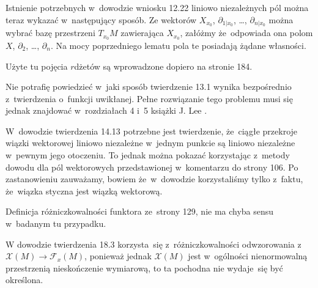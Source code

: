 \documentclass[a4paper,11pt]{article}
\begin{document}
\vspace{\spaceFour}


\start {} Istnienie potrzebnych w~dowodzie wniosku 12.22
liniowo niezależnych pól można teraz wykazać w~następujący sposób. Ze
wektorów $X_{ x_{ 0 } }$, $\partial_{ 1 | { x_{ 0 } } }$, \ldots,
$\partial_{ n | { x_{ 0 } } }$ można wybrać bazę przestrzeni
$T_{ { x_{ 0 } } }M$ zawierająca $X_{ { x_{ 0 } } }$, załóżmy
że~odpowiada ona polom $X$, $\partial_{ 2 }$, \ldots,
$\partial_{ n }$. Na mocy poprzedniego lematu pola te posiadają żądane
własności.

\vspace{\spaceFour}


\start {} Użyte tu pojęcia $r$\dywiz dżetów są wprowadzone
dopiero na stronie 184.

\vspace{\spaceFour}


\start {} Nie potrafię powiedzieć w~jaki sposób twierdzenie
13.1 wynika bezpośrednio z~twierdzenia o~funkcji uwikłanej. Pełne
rozwiązanie tego problemu musi się jednak znajdować w~rozdziałach 4
i~5 książki J. Lee \cite{Lee13}.

\vspace{\spaceFour}


\start {} W~dowodzie twierdzenia 14.13 potrzebne jest
twierdzenie, że~ciągłe przekroje wiązki wektorowej liniowo niezależne
w~jednym punkcie są liniowo niezależne w~pewnym jego otoczeniu. To
jednak można pokazać korzystając z~metody dowodu dla pól wektorowych
przedstawionej w~komentarzu do strony 106. Po zastanowieniu zauważamy,
bowiem że~w~dowodzie korzystaliśmy tylko z~faktu, że~wiązka styczna
jest wiązką wektorową.

\vspace{\spaceFour}


\start {} Definicja różniczkowalności funktora ze~strony 129,
nie ma chyba sensu w~badanym tu przypadku.

\vspace{\spaceFour}


\start {} W dowodzie twierdzenia 18.3 korzysta~się
z~różniczkowalności odwzorowania
z~$\mathcal{X}( M ) \to \mathcal{F}_{ x }( M )$, ponieważ jednak
$\mathcal{X}( M )$ jest w~ogólności nienormowalną przestrzenią
nieskończenie wymiarową, to ta pochodna nie wydaje~się być określona.

\vspace{\spaceFour}
\end{document}
